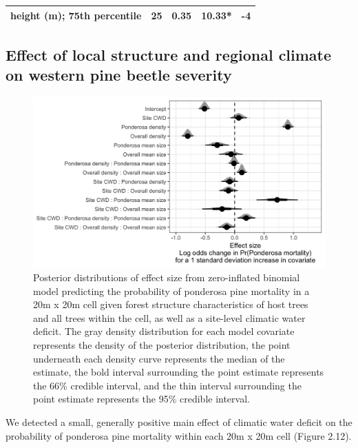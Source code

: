 \documentclass[twoside,12pt,final]{ucthesis-CA2012}
\begin{document}
\begin{ucmainmatter}
\begin{longtable}[]{@{}ccccc@{}}
\begin{minipage}[t]{0.28\columnwidth}\centering\strut
height (m); 75th percentile\strut
\end{minipage} & \begin{minipage}[t]{0.13\columnwidth}\centering\strut
25\strut
\end{minipage} & \begin{minipage}[t]{0.24\columnwidth}\centering\strut
0.35\strut
\end{minipage} & \begin{minipage}[t]{0.08\columnwidth}\centering\strut
10.33*\strut
\end{minipage} & \begin{minipage}[t]{0.13\columnwidth}\centering\strut
-4\strut
\end{minipage}\tabularnewline
\bottomrule
\end{longtable}
\subsection{Effect of local structure and regional climate on western
pine beetle
severity}\label{effect-of-local-structure-and-regional-climate-on-western-pine-beetle-severity}
\begin{figure}
\centering
\includegraphics[width=6.00000in]{figure/chap02/effect-sizes-halfeye.png}
\caption{Posterior distributions of effect size from zero-inflated
binomial model predicting the probability of ponderosa pine mortality in
a 20m x 20m cell given forest structure characteristics of host trees
and all trees within the cell, as well as a site-level climatic water
deficit. The gray density distribution for each model covariate
represents the density of the posterior distribution, the point
underneath each density curve represents the median of the estimate, the
bold interval surrounding the point estimate represents the 66\%
credible interval, and the thin interval surrounding the point estimate
represents the 95\% credible interval.}
\end{figure}
We detected a small, generally positive main effect of climatic water
deficit on the probability of ponderosa pine mortality within each 20m x
20m cell (Figure 2.12).


\end{ucmainmatter}
\end{document}
